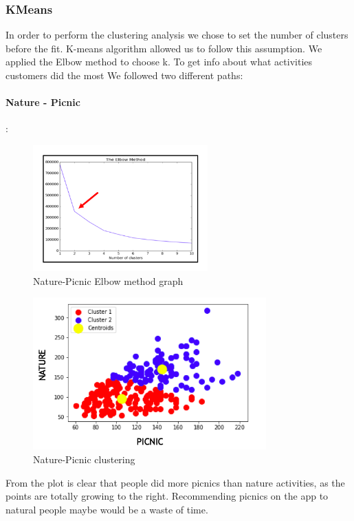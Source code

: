 \clearpage
\subsubsection{KMeans}
In order to perform the clustering analysis we chose to set the number of clusters before the fit. K-means algorithm allowed us to follow this assumption. We applied the Elbow method to choose k. To get info about what activities customers did the most We followed two different paths: 

\paragraph*{Nature - Picnic}:
\begin{figure}[H]
\centering
\includegraphics[width=0.6\textwidth]{Img/2_elbow.png}
\caption{Nature-Picnic Elbow method graph}
\end{figure}

\begin{figure}[H]
\centering
\hspace{-1cm}
\includegraphics[width=0.8\textwidth]{Img/2_cluster.png}
	\caption{Nature-Picnic clustering}
\end{figure}
\noindent From the plot is clear that people did more picnics than nature activities, as the points are totally growing to the right. Recommending picnics on the app to natural people maybe would be a waste of time.
\clearpage

